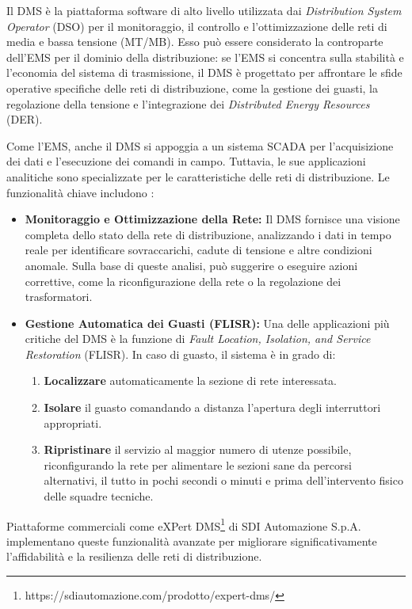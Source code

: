 Il DMS è la piattaforma software di alto livello utilizzata dai \textit{Distribution System Operator} (DSO) per il monitoraggio, il controllo e l'ottimizzazione delle reti di media e bassa tensione (MT/MB). Esso può essere considerato la controparte dell'EMS per il dominio della distribuzione: se l'EMS si concentra sulla stabilità e l'economia del sistema di trasmissione, il DMS è progettato per affrontare le sfide operative specifiche delle reti di distribuzione, come la gestione dei guasti, la regolazione della tensione e l'integrazione dei \textit{Distributed Energy Resources} (DER).


Come l'EMS, anche il DMS si appoggia a un sistema SCADA per l'acquisizione dei dati e l'esecuzione dei comandi in campo. Tuttavia, le sue applicazioni analitiche sono specializzate per le caratteristiche delle reti di distribuzione. Le funzionalità chiave includono \cite{DMS-SDI}:

\begin{itemize}
    \item \textbf{Monitoraggio e Ottimizzazione della Rete:} Il DMS fornisce una visione completa dello stato della rete di distribuzione, analizzando i dati in tempo reale per identificare sovraccarichi, cadute di tensione e altre condizioni anomale. Sulla base di queste analisi, può suggerire o eseguire azioni correttive, come la riconfigurazione della rete o la regolazione dei trasformatori.
    \item \textbf{Gestione Automatica dei Guasti (FLISR):} Una delle applicazioni più critiche del DMS è la funzione di \textit{Fault Location, Isolation, and Service Restoration} (FLISR). In caso di guasto, il sistema è in grado di:
    
    \begin{enumerate}    
        \item \textbf{Localizzare} automaticamente la sezione di rete interessata.
        \item \textbf{Isolare} il guasto comandando a distanza l'apertura degli interruttori appropriati.
        \item \textbf{Ripristinare} il servizio al maggior numero di utenze possibile, riconfigurando la rete per alimentare le sezioni sane da percorsi alternativi, il tutto in pochi secondi o minuti e prima dell'intervento fisico delle squadre tecniche.
    \end{enumerate}
\end{itemize}

Piattaforme commerciali come eXPert DMS\footnote{https://sdiautomazione.com/prodotto/expert-dms/} di SDI Automazione S.p.A. implementano queste funzionalità avanzate per migliorare significativamente l'affidabilità e la resilienza delle reti di distribuzione.

